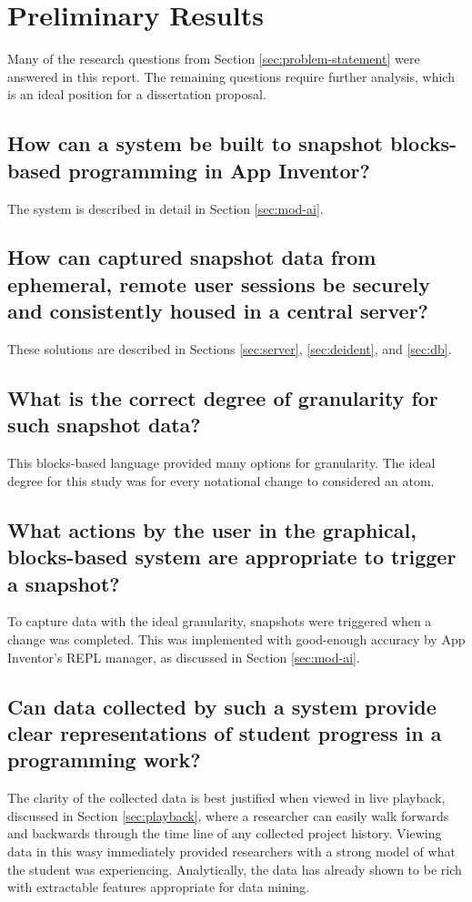 \chapter{Preliminary Results} %
\label{chap:analysis}

Many of the research questions from Section \ref{sec:problem-statement} were answered in this report. The remaining questions require further analysis, which is an ideal position for a dissertation proposal. 

\section{How can a system be built to snapshot blocks-based programming in App Inventor? }
The system is described in detail in Section \ref{sec:mod-ai}.

\section{How can captured snapshot data from ephemeral, remote user sessions be securely and consistently housed in a central server? }
These solutions are described in Sections \ref{sec:server}, \ref{sec:deident}, and \ref{sec:db}.

\section{What is the correct degree of granularity for such snapshot data?}
This blocks-based language provided many options for granularity. The ideal degree for this study was for every notational change to considered an atom.

\section{What actions by the user in the graphical, blocks-based system are appropriate to trigger a snapshot?}
To capture data with the ideal granularity, snapshots were triggered when a change was completed. This was implemented with good-enough accuracy by App Inventor's REPL manager, as discussed in Section \ref{sec:mod-ai}.

\section{Can data collected by such a system provide clear representations of student progress in a programming work?}
The clarity of the collected data is best justified when viewed in live playback, discussed in Section \ref{sec:playback}, where a researcher can easily walk forwards and backwards through the time line of any collected project history. Viewing data in this wasy immediately provided researchers with a strong model of what the student was experiencing. Analytically, the data has already shown to be rich with extractable features appropriate for data mining.

